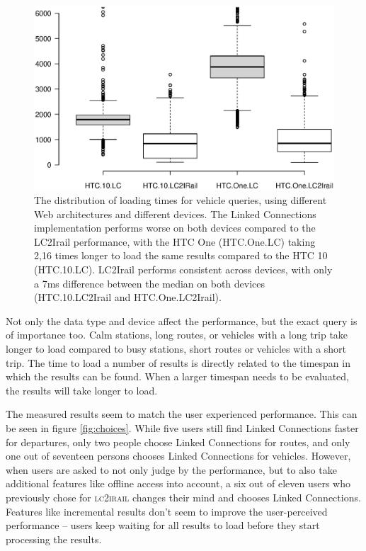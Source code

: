 \documentclass[twocolumn]{phdsymp} %
\begin{document}
\begin{figure}[ht]
	\begin{center}
		\includegraphics[trim=3cm 4cm 0 0, width=.50\textwidth]{images/boxplot_vehicles.eps}
		\caption{\label{fig:vehicle} The distribution of loading times for vehicle queries, using different Web architectures and different devices. The Linked Connections implementation performs worse on both devices compared to the LC2Irail performance, with the HTC One (HTC.One.LC) taking 2,16 times longer to load the same results compared to the HTC 10 (HTC.10.LC). LC2Irail performs consistent across devices, with only a 7ms difference between the median on both devices (HTC.10.LC2Irail and HTC.One.LC2Irail). }
	\end{center}
\end{figure}

Not only the data type and device affect the performance, but the exact query is of importance too. Calm stations, long routes, or vehicles with a long trip take longer to load compared to busy stations, short routes or vehicles with a short trip. The time to load a number of results is directly related to the timespan in which the results can be
found. When a larger timespan needs to be evaluated, the results will take longer to load.

The measured results seem to match the user experienced performance. This can be seen in figure \ref{fig:choices}. While five users still find Linked Connections faster for departures, only two people choose Linked Connections for routes, and only one out of seventeen persons chooses Linked Connections for vehicles. However, when users are asked to not only judge by the performance, but to also take additional features like offline access into account, a six out of eleven users who previously chose for \textsc{lc2irail} changes their mind and chooses Linked Connections. Features like incremental results don’t seem to improve the user-perceived performance – users keep waiting for all results to load before they start processing the results.
\end{document}

